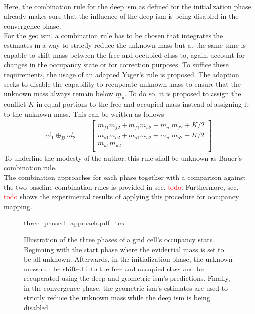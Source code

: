 \\
Here, the combination rule for the deep \gls{ism} as defined for the initialization phase already makes sure that the influence of the deep \gls{ism} is being disabled in the convergence phase. 
\\
For the geo \gls{ism}, a combination rule has to be chosen that integrates the estimates in a way to strictly reduce the unknown mass but at the same time is capable to shift mass between the free and occupied class to, again, account for changes in the occupancy state or for correction purposes. To suffice these requirements, the usage of an adapted Yager's rule is proposed. The adaption seeks to disable the capability to recuperate unknown mass to ensure that the unknown mass always remain below $\underline{m}_{u}$. To do so, it is proposed to assign the conflict $K$ in equal portions to the free and occupied mass instead of assigning it to the unknown mass. This can be written as follows
\begin{align}
	\label{eq:bauers_rule}
	\vec{m}_1 \oplus_B \vec{m}_2 &=  
	\begin{bmatrix} 
		m_{f1}m_{f2} + m_{f1}m_{u2} + m_{u1}m_{f2} + K/2\\
		m_{o1}m_{o2} + m_{o1}m_{u2} + m_{u1}m_{o2} + K/2\\
		m_{u1}m_{u2}\\
	\end{bmatrix}
\end{align}
To underline the modesty of the author, this rule shall be unknown as Bauer's combination rule.
\\
The combination approaches for each phase together with a comparison against the two baseline combination rules is provided in sec. \textcolor{red}{todo}. Furthermore, sec. \textcolor{red}{todo} shows the experimental results of applying this procedure for occupancy mapping.
\begin{figure}
	\begin{center}
		{three_phased_approach.pdf_tex}
		\caption{\label{fig:three_phased_approach}Illustration of the three phases of a grid cell's occupancy state. Beginning with the start phase where the evidential mass is set to be all unknown. Afterwards, in the initialization phase, the unknown mass can be shifted into the free and occupied class and be recuperated using the deep and geometric \gls{ism}'s predictions. Finally, in the convergence phase, the geometric \gls{ism}'s estimates are used to strictly reduce the unknown mass while the deep \gls{ism} is being disabled.}
	\end{center}
\end{figure}  



